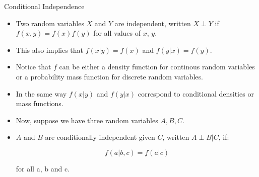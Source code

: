 \documentclass[handout]{beamer}
\begin{document}
\begin{frame}{Conditional Independence}
\scriptsize{
\begin{itemize}

\item Two random variables $X$ and $Y$ are independent, written $X \perp Y$ if $f(x,y)=f(x)f(y)$ for all values of $x$, $y$.


\item This also implies that $f(x|y)=f(x)$ and $f(y|x)=f(y)$.


\item Notice that $f$ can be either a density function for continous random variables or a probability mass function for discrete random variables.

\item In the same way  $f(x|y)$ and $f(y|x)$ correspond to conditional densities or mass functions. 

\item Now, suppose we have three random variables $A,B,C$. 

\item $A$ and $B$ are conditionally independent given $C$, written $A \perp B | C$, if:

\begin{displaymath}
f(a|b,c) = f(a|c)
\end{displaymath}


for all a, b and c.


 
\end{itemize}




} 

\end{frame}
\end{document}
